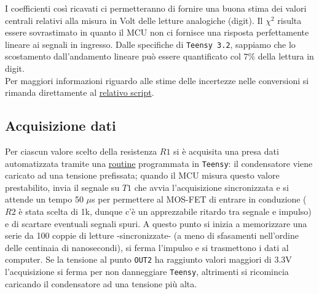 \documentclass{article}[a4paper, oneside, 11pt]
\begin{document}
\begin{figure}[H]%
\centering
\begin{subfigure}{.5\textwidth}
	\centering 
	\def\svgwidth{\columnwidth}
		
	\label{fig: cal0}
\end{subfigure}%
\begin{subfigure} {.5\textwidth}
	\centering 
	\def\svgwidth{\columnwidth}
		
	\label{fig: cal1}
\end{subfigure}
\end{figure}

I coefficienti così ricavati ci permetteranno di fornire una buona stima 
dei valori centrali relativi alla misura in Volt delle letture analogiche 
(digit). Il $\chi^2$ risulta essere sovrastimato in quanto il MCU non ci 
fornisce una risposta perfettamente lineare ai segnali in ingresso. Dalle 
specifiche di \verb+Teensy 3.2+, sappiamo che lo scostamento dall'andamento
lineare può essere quantificato col $7 \%$ della lettura in digit.\\
Per maggiori informazioni riguardo alle stime delle incertezze nelle 
conversioni si rimanda direttamente al 
\href{https://github.com/LucaCiucci/relaz_seme/blob/master/Cartella_fit/funzioni.py}
{relativo script}.

\subsection{Acquisizione dati}
Per ciascun valore scelto della resistenza $R1$ si è acquisita una presa 
dati automatizzata tramite una 
\href{https://github.com/LucaCiucci/relaz_seme/blob/master/sketches/teensy_differenziale_definitivo/teensy_differenziale_definitivo.ino}
{routine} programmata in \verb+Teensy+: il condensatore viene caricato
ad una tensione prefissata; quando il MCU misura questo valore
prestabilito, invia il segnale su $T1$ che avvia l'acquisizione sincronizzata
e si attende un tempo 50 $\mu$s per permettere al MOS-FET di entrare in
conduzione ($R2$ è stata scelta di 1k, dunque c'è un apprezzabile ritardo
tra segnale e impulso) e di scartare eventuali segnali spuri. A questo punto
si inizia a memorizzare una serie da 100 coppie di letture -sincronizzate-
(a meno di sfasamenti nell'ordine delle centinaia di nanosecondi), si ferma
l'impulso e si trasmettono i dati al computer. Se la tensione al punto
\verb+OUT2+ ha raggiunto valori maggiori di 3.3V l'acquisizione si ferma
per non danneggiare \verb+Teensy+, altrimenti si ricomincia caricando il
condensatore ad una tensione più alta.
\end{document}
